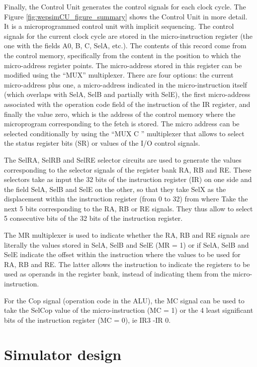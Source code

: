 Finally, the Control Unit generates the control signals for each clock cycle. The Figure \ref{fig:wepsimCU_figure_summary} shows the Control Unit in more detail. It is a microprogrammed control unit with implicit sequencing. The control signals for the current clock cycle are stored in the micro-instruction register (the one with the fields A0, B, C, SelA, etc.). The contents of this record come from the control memory, specifically from the content in the position to which the micro-address register points. The micro-address stored in this register can be modified using the ``MUX'' multiplexer. There are four options: the current micro-address plus one, a micro-address indicated in the micro-instruction itself (which overlaps with SelA, SelB and partially with SelE), the first micro-address associated with the operation code field of the instruction of the IR register, and finally the value zero, which is the address of the control memory where the microprogram corresponding to the fetch is stored. The micro address can be selected conditionally by using the ``MUX C '' multiplexer that allows to select the status register bits (SR) or values of the I/O control signals. 

The SelRA, SelRB and SelRE selector circuits are used to generate the values corresponding to the selector signals of the register bank RA, RB and RE. These selectors take as input the 32 bits of the instruction register (IR) on one side and the field SelA, SelB and SelE on the other, so that they take SelX as the displacement within the instruction register (from 0 to 32) from where Take the next 5 bits corresponding to the RA, RB or RE signals. They thus allow to select 5 consecutive bits of the 32 bits of the instruction register.

The MR multiplexer is used to indicate whether the RA, RB and RE signals are literally the values stored in SelA, SelB and SelE (MR = 1) or if SelA, SelB and SelE indicate the offset within the instruction where the values to be used for RA, RB and RE. The latter allows the instruction to indicate the registers to be used as operands in the register bank, instead of indicating them from the micro-instruction.

For the Cop signal (operation code in the ALU), the MC signal can be used to take the SelCop value of the micro-instruction (MC = 1) or the 4 least significant bits of the instruction register (MC = 0), ie IR3 -IR 0.

\section*{Simulator design}

